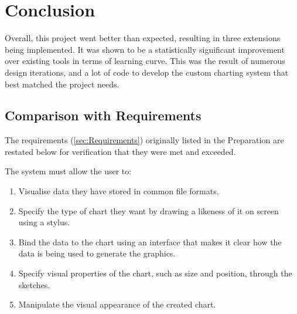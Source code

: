 \chapter{Conclusion}
Overall, this project went better than expected, resulting in three extensions being implemented. It was shown to be a statistically significant improvement over existing tools in terms of learning curve. This was the result of numerous design iterations, and a lot of code to develop the custom charting system that best matched the project needs.

\section{Comparison with Requirements}
The requirements (\autoref{sec:Requirements}) originally listed in the Preparation are restated below for verification that they were met and exceeded.

The system must allow the user to:
	\begin{enumerate}[label=\bfseries Core \arabic*]
		\item Visualise data they have stored in common file formats.
		\item Specify the type of chart they want by drawing a likeness of it on screen using a stylus.
		\item Bind the data to the chart using an interface that makes it clear how the data is being used to generate the graphics.
		\item Specify visual properties of the chart, such as size and position, through the sketches.
		\item Manipulate the visual appearance of the created chart.
	\end{enumerate}
	
